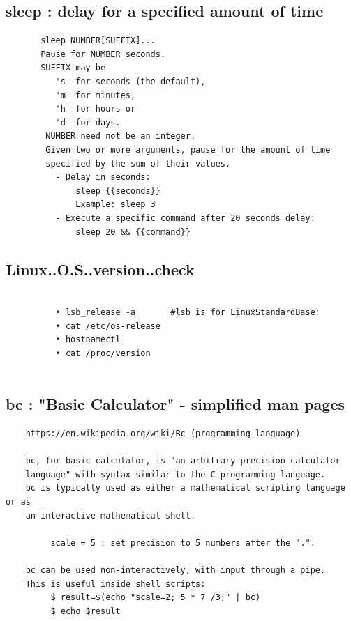 \documentclass[a4paper,12pt]{article}
\begin{document}
\subsection{sleep   : delay for a specified amount of time}
\begin{verbatim}
       sleep NUMBER[SUFFIX]...
       Pause for NUMBER seconds.  
       SUFFIX may be 
          's' for seconds (the default),
          'm' for minutes, 
          'h' for hours or 
          'd' for days.  
        NUMBER need not be an integer. 
        Given two or more arguments, pause for the amount of time
        specified by the sum of their values.
          - Delay in seconds:
              sleep {{seconds}}
              Example: sleep 3
          - Execute a specific command after 20 seconds delay:
              sleep 20 && {{command}}
\end{verbatim}


\subsection{Linux..O.S..version..check }
\begin{verbatim}
     
          • lsb_release -a       #lsb is for LinuxStandardBase: 
          • cat /etc/os-release
          • hostnamectl
          • cat /proc/version
          
\end{verbatim}



\subsection{bc       : "Basic Calculator" - simplified man pages}
\begin{verbatim}
    https://en.wikipedia.org/wiki/Bc_(programming_language)
     
    bc, for basic calculator, is "an arbitrary-precision calculator 
    language" with syntax similar to the C programming language. 
    bc is typically used as either a mathematical scripting language or as
    an interactive mathematical shell. 

         scale = 5 : set precision to 5 numbers after the ".".
    
    bc can be used non-interactively, with input through a pipe. 
    This is useful inside shell scripts:
         $ result=$(echo "scale=2; 5 * 7 /3;" | bc)
         $ echo $result
\end{verbatim}
\end{document}
